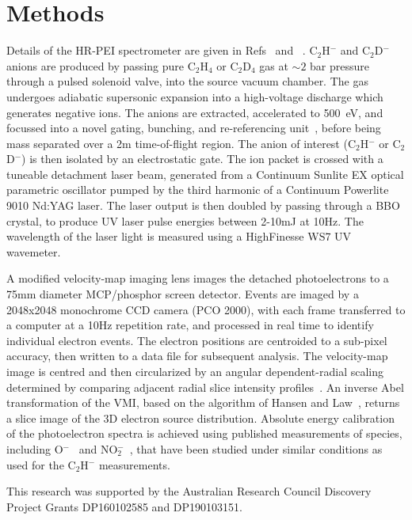 \documentclass[journal=jpcafh,manuscript=article,layout=onecolumn, 12pt]{achemso}
\newcommand{\onlinecite}[1]{\hspace{-1 ex} \nocite{#1}\citenum{#1}}
\begin{document}
\section{Methods}
Details of the HR-PEI spectrometer are given in Refs~\onlinecite{cav07} and~\onlinecite{dev17}. C$_2$H$^-$ and C$_2$D$^-$ anions are produced by passing pure C$_2$H$_4$ or C$_2$D$_4$ gas at $\sim2$ bar pressure through a pulsed solenoid valve, into the source vacuum chamber. The gas undergoes adiabatic supersonic expansion into a high-voltage discharge which generates negative ions. The anions are extracted, accelerated to 500~eV, and focussed into a novel gating, bunching, and re-referencing unit~\cite{ded01}, before being mass separated over a 2m time-of-flight region. The anion of interest (C$_2$H$^-$ or C$_2$D$^-$) is then isolated by an electrostatic gate. The ion packet is crossed with a tuneable detachment laser beam, generated from a Continuum Sunlite EX optical parametric oscillator pumped by the third harmonic of a Continuum Powerlite 9010 Nd:YAG laser. The laser output is then doubled by passing through a BBO crystal, to produce UV laser pulse energies between 2-10mJ at 10Hz. The wavelength of the laser light is measured using a HighFinesse WS7 UV wavemeter.

A modified velocity-map imaging lens images the detached photoelectrons to a 75mm diameter MCP/phosphor screen detector. Events are imaged by a 2048x2048 monochrome CCD camera (PCO 2000), with each frame transferred to a computer at a 10Hz repetition rate, and processed in real time to identify individual electron events. The electron positions are centroided to a sub-pixel accuracy, then written to a data file for subsequent analysis. The velocity-map image is centred and then circularized by an angular dependent-radial scaling determined by comparing adjacent radial slice intensity profiles~\cite{gas17}. An inverse Abel transformation of the VMI, based on the algorithm of Hansen and Law~\cite{han85,hic19}, returns a slice image of the 3D electron source distribution. Absolute energy calibration of the photoelectron spectra is achieved using published measurements of species, including O$^-$~\cite{cav07} and NO$_2^-$~\cite{law19}, that have been studied under similar conditions as used for the C$_2$H$^-$ measurements.




\begin{acknowledgement}
	This research was supported by the Australian Research Council Discovery
	Project Grants DP160102585 and DP190103151.  
\end{acknowledgement}


\end{document}
